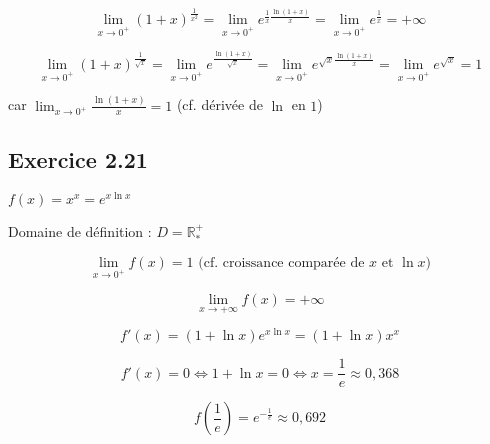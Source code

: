 \documentclass[a4paper,10pt]{report}
\begin{document}
\begin{displaymath}
	\lim_{x \rightarrow 0^{+}} (1+x)^\frac{1}{x^2} 
		= \lim_{x \rightarrow 0^{+}} e^{\frac{1}{x}\frac{\ln(1+x)}{x}} 
		= \lim_{x \rightarrow 0^{+}} e^{\frac{1}{x}}
		= +\infty
\end{displaymath}

\begin{displaymath}
	\lim_{x \rightarrow 0^{+}} (1+x)^\frac{1}{\sqrt{x}} 
		= \lim_{x \rightarrow 0^{+}} e^{\frac{\ln(1+x)}{\sqrt{x}}} 
		= \lim_{x \rightarrow 0^{+}} e^{\sqrt{x}\frac{\ln(1+x)}{x}}
		= \lim_{x \rightarrow 0^{+}} e^{\sqrt{x}}
		= 1
\end{displaymath}

car $\lim_{x \rightarrow 0^{+}} \frac{\ln(1+x)}{x} = 1$ (cf. dérivée de $\ln$ en $1$)

\subsection*{Exercice 2.21}

$f(x) = x^x = e^{x \ln x}$

Domaine de définition : $D = \mathbb{R}^+_*$

\begin{displaymath}
	\lim_{x \rightarrow 0^{+}} f(x) = 1  \text{ (cf. croissance comparée de $x$ et $\ln x$)}
\end{displaymath}

\begin{displaymath}
	\lim_{x \rightarrow +\infty} f(x) = +\infty
\end{displaymath}

\begin{displaymath}
	f'(x) = (1+ \ln x)e^{x \ln x} = (1+ \ln x)x^x
\end{displaymath}

\begin{displaymath}
	f'(x) = 0 \Longleftrightarrow 1 + \ln x = 0 \Longleftrightarrow x = \frac{1}{e} \approx 0,368
\end{displaymath}

\begin{displaymath}
	f\left(\frac{1}{e}\right) = e^{-\frac{1}{e}} \approx 0,692
\end{displaymath}

\end{document}
